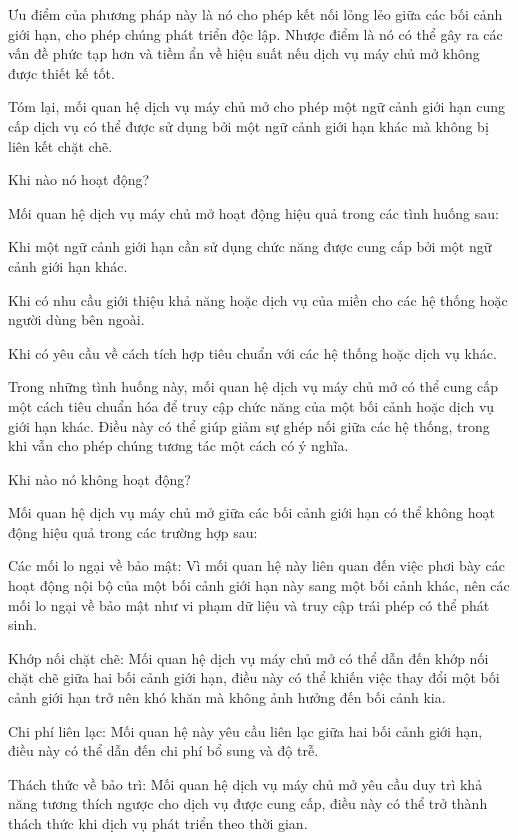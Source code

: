 Ưu điểm của phương pháp này là nó cho phép kết nối lỏng lẻo giữa các bối cảnh giới hạn, cho phép chúng phát triển độc lập. Nhược điểm là nó có thể gây ra các vấn đề phức tạp hơn và tiềm ẩn về hiệu suất nếu dịch vụ máy chủ mở không được thiết kế tốt.

Tóm lại, mối quan hệ dịch vụ máy chủ mở cho phép một ngữ cảnh giới hạn cung cấp dịch vụ có thể được sử dụng bởi một ngữ cảnh giới hạn khác mà không bị liên kết chặt chẽ.

Khi nào nó hoạt động?

Mối quan hệ dịch vụ máy chủ mở hoạt động hiệu quả trong các tình huống sau:

Khi một ngữ cảnh giới hạn cần sử dụng chức năng được cung cấp bởi một ngữ cảnh giới hạn khác.

Khi có nhu cầu giới thiệu khả năng hoặc dịch vụ của miền cho các hệ thống hoặc người dùng bên ngoài.

Khi có yêu cầu về cách tích hợp tiêu chuẩn với các hệ thống hoặc dịch vụ khác.

Trong những tình huống này, mối quan hệ dịch vụ máy chủ mở có thể cung cấp một cách tiêu chuẩn hóa để truy cập chức năng của một bối cảnh hoặc dịch vụ giới hạn khác. Điều này có thể giúp giảm sự ghép nối giữa các hệ thống, trong khi vẫn cho phép chúng tương tác một cách có ý nghĩa.

Khi nào nó không hoạt động?

Mối quan hệ dịch vụ máy chủ mở giữa các bối cảnh giới hạn có thể không hoạt động hiệu quả trong các trường hợp sau:

Các mối lo ngại về bảo mật: Vì mối quan hệ này liên quan đến việc phơi bày các hoạt động nội bộ của một bối cảnh giới hạn này sang một bối cảnh khác, nên các mối lo ngại về bảo mật như vi phạm dữ liệu và truy cập trái phép có thể phát sinh.

Khớp nối chặt chẽ: Mối quan hệ dịch vụ máy chủ mở có thể dẫn đến khớp nối chặt chẽ giữa hai bối cảnh giới hạn, điều này có thể khiến việc thay đổi một bối cảnh giới hạn trở nên khó khăn mà không ảnh hưởng đến bối cảnh kia.

Chi phí liên lạc: Mối quan hệ này yêu cầu liên lạc giữa hai bối cảnh giới hạn, điều này có thể dẫn đến chi phí bổ sung và độ trễ.

Thách thức về bảo trì: Mối quan hệ dịch vụ máy chủ mở yêu cầu duy trì khả năng tương thích ngược cho dịch vụ được cung cấp, điều này có thể trở thành thách thức khi dịch vụ phát triển theo thời gian.


